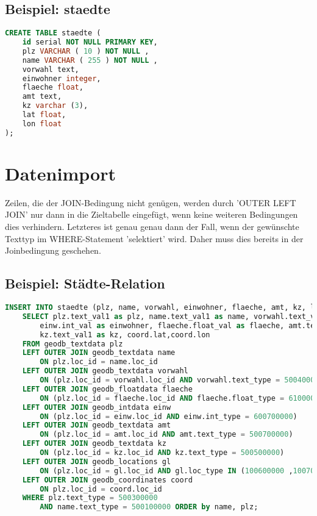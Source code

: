 \documentclass[11pt,a4paper,DIV=10,]{scrartcl}
\begin{document}
\subsection*{Beispiel: staedte}
\begin{lstlisting}[language=sql]
CREATE TABLE staedte (
	id serial NOT NULL PRIMARY KEY,
	plz VARCHAR ( 10 ) NOT NULL ,
	name VARCHAR ( 255 ) NOT NULL ,
	vorwahl text,	
	einwohner integer,
	flaeche float,
	amt text, 
	kz varchar (3),
	lat float,
	lon float
);
\end{lstlisting}
\section{Datenimport}
Zeilen, die der JOIN-Bedingung nicht genügen, werden durch 'OUTER LEFT JOIN' nur dann in die Zieltabelle eingefügt, wenn keine weiteren Bedingungen dies verhindern. Letzteres ist genau  genau dann der Fall, wenn der gewünschte Texttyp im WHERE-Statement 'selektiert' wird. Daher muss dies bereits in der Joinbedingung geschehen.
\subsection*{Beispiel: Städte-Relation}
\begin{lstlisting}[language=sql]
INSERT INTO staedte (plz, name, vorwahl, einwohner, flaeche, amt, kz, lat, lon)
	SELECT plz.text_val1 as plz, name.text_val1 as name, vorwahl.text_val1 as vorwahl,
		einw.int_val as einwohner, flaeche.float_val as flaeche, amt.text_val1 as amt,
		kz.text_val1 as kz, coord.lat,coord.lon
	FROM geodb_textdata plz
	LEFT OUTER JOIN geodb_textdata name 
		ON plz.loc_id = name.loc_id
	LEFT OUTER JOIN geodb_textdata vorwahl 
		ON (plz.loc_id = vorwahl.loc_id AND vorwahl.text_type = 500400000)
	LEFT OUTER JOIN geodb_floatdata flaeche 
		ON (plz.loc_id = flaeche.loc_id AND flaeche.float_type = 610000000)
	LEFT OUTER JOIN geodb_intdata einw 
		ON (plz.loc_id = einw.loc_id AND einw.int_type = 600700000)
	LEFT OUTER JOIN geodb_textdata amt 
		ON (plz.loc_id = amt.loc_id AND amt.text_type = 500700000)
	LEFT OUTER JOIN geodb_textdata kz 
		ON (plz.loc_id = kz.loc_id AND kz.text_type = 500500000)
	LEFT OUTER JOIN geodb_locations gl 
		ON (plz.loc_id = gl.loc_id AND gl.loc_type IN (100600000 ,100700000))
	LEFT OUTER JOIN geodb_coordinates coord 
		ON plz.loc_id = coord.loc_id
	WHERE plz.text_type = 500300000
		AND name.text_type = 500100000 ORDER by name, plz;
\end{lstlisting}



\end{document}
